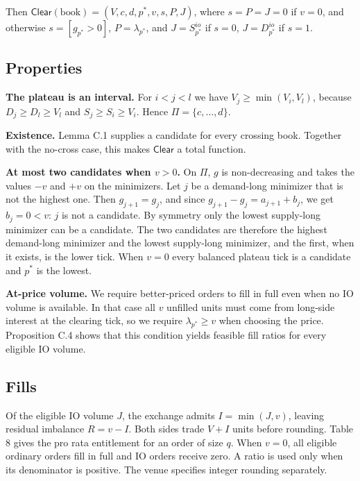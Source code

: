 Then \(\mathsf{Clear}(\text{book}) = (V, c, d, p^*, v, s, P, J)\), where \(s = P = J = 0\) if \(v = 0\), and otherwise \(s = [g_{p^*} > 0]\), \(P = \lambda_{p^*}\), and \(J = S^{io}_{p^*}\) if \(s = 0\), \(J = D^{io}_{p^*}\) if \(s = 1\).

\subsection{Properties}

\textbf{The plateau is an interval.} For \(i < j < l\) we have \(V_j \ge \min(V_i, V_l)\), because \(D_j \ge D_l \ge V_l\) and \(S_j \ge S_i \ge V_i\). Hence \(\Pi = \{c, \ldots, d\}\).

\textbf{Existence.} Lemma C.1 supplies a candidate for every crossing book. Together with the no-cross case, this makes \(\mathsf{Clear}\) a total function.

\textbf{At most two candidates when \(v > 0\).} On \(\Pi\), \(g\) is non-decreasing and takes the values \(-v\) and \(+v\) on the minimizers. Let \(j\) be a demand-long minimizer that is not the highest one. Then \(g_{j+1} = g_j\), and since \(g_{j+1} - g_j = a_{j+1} + b_j\), we get \(b_j = 0 < v\): \(j\) is not a candidate. By symmetry only the lowest supply-long minimizer can be a candidate. The two candidates are therefore the highest demand-long minimizer and the lowest supply-long minimizer, and the first, when it exists, is the lower tick. When \(v = 0\) every balanced plateau tick is a candidate and \(p^*\) is the lowest.

\textbf{At-price volume.} We require better-priced orders to fill in full even when no IO volume is available. In that case all \(v\) unfilled units must come from long-side interest at the clearing tick, so we require \(\lambda_{p^*}\ge v\) when choosing the price. Proposition C.4 shows that this condition yields feasible fill ratios for every eligible IO volume.

\subsection{Fills}

Of the eligible IO volume \(J\), the exchange admits \(I=\min(J,v)\), leaving residual imbalance \(R=v-I\). Both sides trade \(V+I\) units before rounding. Table 8 gives the pro rata entitlement for an order of size \(q\). When \(v=0\), all eligible ordinary orders fill in full and IO orders receive zero. A ratio is used only when its denominator is positive. The venue specifies integer rounding separately.


